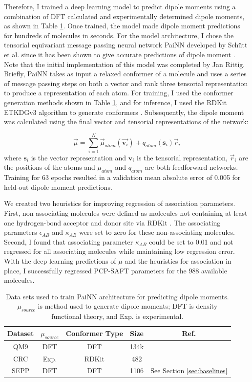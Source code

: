 Therefore, I trained a deep learning model to predict dipole moments using a combination of DFT calculated and experimentally determined dipole moments, as shown in Table \ref{tab:painn_data}.  Once trained, the model made dipole moment predictions for hundreds of molecules in seconds. For the model architecture, I chose the tensorial equivariant message passing neural network PaiNN developed by Schütt et al. since it has been shown to give accurate predictions of dipole moment \cite{Schutt2021}. Note that the initial implementation of this model was completed by Jan Rittig. Briefly, PaiNN takes as input a relaxed conformer of a molecule and uses a series of message passing steps on both a vector and rank three tensorial representation to produce a representation of each atom. For training, I used the conformer generation methods shown in Table \ref{tab:painn_data}, and for inference, I used the RDKit ETKDGv3 algorithm to generate conformers \cite{Wang2020}. Subsequently, the dipole moment was calculated using the final vector and tensorial representations of the network:

\begin{equation}
    \vec \mu = \sum_{i=1}^N \vec \mu_{atom}(\vec{\mathbf v_i}) + q_{atom}(\mathbf s_i)\vec r_i
\end{equation}
where $\mathbf s_i$ is the vector representation and $\mathbf v_i$ is the tensorial representation, $\vec r_i$ are the positions of the atoms and $\mu_{atom}$ and $q_{atom}$ are both feedforward networks. Training for 63 epochs resulted in a validation mean absolute error of 0.005 for held-out dipole moment predictions.

We created two heuristics for improving regression of association parameters. First, non-associating molecules were defined as molecules not containing at least one hydrogen-bond acceptor and donor site via RDKit \cite{rdkit}. The associating parameters $\epsilon_{AB}$ and $\kappa_{AB}$ were set to zero for these non-associating molecules. Second, I found that associating parameter $\kappa_{AB}$ could be set to 0.01 and not regressed for all associating molecules while maintaining low regression error. With the deep learning predictions of $\mu$ and the heuristics for association in place, I successfully regressed PCP-SAFT parameters for the 988 available molecules. 

\begin{table}[]
    \centering
    \caption{Data sets used to train PaiNN architecture for predicting dipole moments. $\mu_{source}$ is method used to generate dipole moments; DFT is density functional theory, and Exp. is experimental.}
    \begin{tabular}{ccccc}
         Dataset & $\mu_{source}$ & Conformer Type & Size & Ref.  \\
         \hline
         QM9 & DFT & DFT & 134k & \cite{Ramakrishnan2014}\\
         CRC & Exp. & RDKit\cite{Wang2020} & 482 & \cite{CRC2014} \\
         SEPP & DFT & DFT & 1106 & See Section \ref{sec:baselines}
    \end{tabular}

    \label{tab:painn_data}
\end{table}


